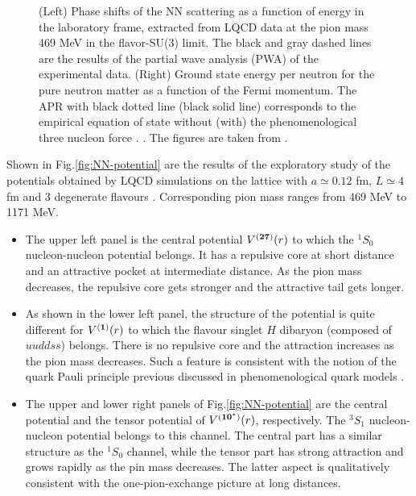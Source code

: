 \begin{figure}[t]
\begin{center}
 \end{center}
\caption{(Left) Phase shifts of the NN scattering as a
function of energy in the laboratory frame, extracted from
LQCD data at the pion mass 469 MeV in the flavor-SU(3) limit.
 The black and gray dashed lines are the results of the partial wave
analysis (PWA) of the experimental data. (Right) Ground state energy per neutron for the
pure neutron matter as a function of the Fermi momentum.
 The APR with black dotted line (black solid line)   corresponds to the empirical equation of state without (with) the
phenomenological three nucleon force \cite{Akmal:1998cf}.
 \cite{Akmal:1998cf}.
The figures are taken from \cite{Inoue:2013nfe}.
  }
\label{fig:NN-phase_shift}
\end{figure}


Shown in Fig.\ref{fig:NN-potential}  are the results of the exploratory study of the potentials
obtained by LQCD simulations on the lattice  with $a\simeq 0.12$ fm, 
$L\simeq 4$ fm and 3 degenerate flavours  \cite{Inoue:2011ai}.  Corresponding pion mass ranges from
 469 MeV to 1171 MeV. 
\begin{itemize}
\item  The upper left panel is the 
central potential $V^{({\bf 27})}(r)$ to which the  $^1S_0$ nucleon-nucleon potential belongs.
 It  has a repulsive core at short distance and an attractive pocket at intermediate distance.
As the pion mass decreases,  the repulsive core gets stronger and the attractive tail gets
 longer.  
\item As shown in the lower left panel, the structure of the potential is quite different for $V^{({\bf 1})}(r)$ to which the
  flavour singlet $H$ dibaryon (composed of $uuddss$) belongs.   There is no repulsive core and the attraction 
  increases as the pion mass decreases.  Such a feature is consistent with the 
   notion of  the quark Pauli principle previous discussed in phenomenological quark models \cite{Oka-Fujiwara}.
\item The upper and lower right panels of  Fig.\ref{fig:NN-potential}  are the 
central potential and the tensor potential of $V^{({\bf 10}^*)}(r)$, respectively. The
$^3S_1$ nucleon-nucleon potential belongs to this channel. The central part has a similar
structure as the $^1S_0$ channel, while the tensor part has strong attraction and grows rapidly  as the 
 pin mass decreases.  The latter aspect is qualitatively consistent with the one-pion-exchange picture at
 long distances.
 \end{itemize}
   
